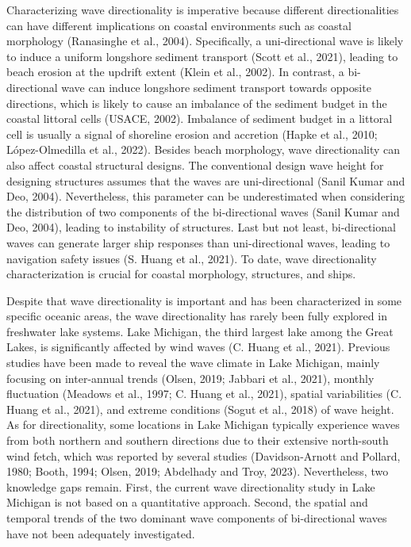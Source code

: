 Characterizing wave directionality is imperative because different directionalities can have different implications on coastal environments such as coastal morphology (Ranasinghe et al., 2004). Specifically, a uni-directional wave is likely to induce a uniform longshore sediment transport (Scott et al., 2021), leading to beach erosion at the updrift extent (Klein et al., 2002). In contrast, a bi-directional wave can induce longshore sediment transport towards opposite directions, which is likely to cause an imbalance of the sediment budget in the coastal littoral cells (USACE, 2002). Imbalance of sediment budget in a littoral cell is usually a signal of shoreline erosion and accretion (Hapke et al., 2010; López-Olmedilla et al., 2022). Besides beach morphology, wave directionality can also affect coastal structural designs. The conventional design wave height for designing structures assumes that the waves are uni-directional (Sanil Kumar and Deo, 2004). Nevertheless, this parameter can be underestimated when considering the distribution of two components of the bi-directional waves (Sanil Kumar and Deo, 2004), leading to instability of structures. Last but not least, bi-directional waves can generate larger ship responses than uni-directional waves, leading to navigation safety issues (S. Huang et al., 2021). To date, wave directionality characterization is crucial for coastal morphology, structures, and ships.

Despite that wave directionality is important and has been characterized in some specific oceanic areas, the wave directionality has rarely been fully explored in freshwater lake systems. Lake Michigan, the third largest lake among the Great Lakes, is significantly affected by wind waves (C. Huang et al., 2021). Previous studies have been made to reveal the wave climate in Lake Michigan, mainly focusing on inter-annual trends (Olsen, 2019; Jabbari et al., 2021), monthly fluctuation (Meadows et al., 1997; C. Huang et al., 2021), spatial variabilities (C. Huang et al., 2021), and extreme conditions (Sogut et al., 2018) of wave height. As for directionality, some locations in Lake Michigan typically experience waves from both northern and southern directions due to their extensive north-south wind fetch, which was reported by several studies (Davidson-Arnott and Pollard, 1980; Booth, 1994; Olsen, 2019; Abdelhady and Troy, 2023). Nevertheless, two knowledge gaps remain. First, the current wave directionality study in Lake Michigan is not based on a quantitative approach. Second, the spatial and temporal trends of the two dominant wave components of bi-directional waves have not been adequately investigated.

